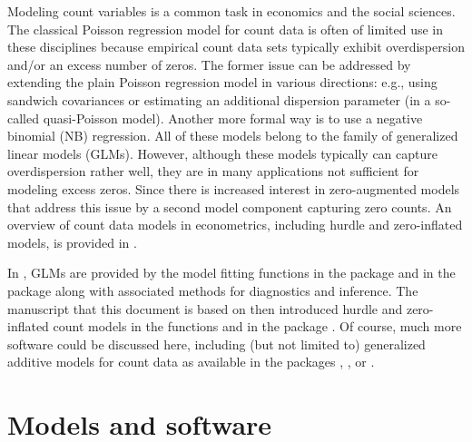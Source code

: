 \documentclass[article]{jss}
\newcommand{\fct}[1]{\code{#1()}}
\begin{document}
Modeling count variables is a common task in economics and the social sciences.
The classical Poisson regression model for count data is often of limited use in
these disciplines because empirical count data sets typically exhibit
overdispersion and/or an excess number of zeros. The former issue can be
addressed by extending  the plain Poisson regression model in various
directions: e.g., using sandwich covariances or estimating an additional
dispersion parameter (in a so-called quasi-Poisson model). Another more formal
way is to use a negative binomial (NB) regression. All of these models belong to
the family of generalized linear models (GLMs). However, although these models
typically can capture overdispersion rather well, they are in many applications
not sufficient for  modeling excess zeros. Since \cite{Mullahy:1986} there is
increased interest in zero-augmented models that address this issue by a second
model component capturing zero counts. An overview of count data models in
econometrics, including  hurdle and zero-inflated models, is provided in
\cite{Cameron+Trivedi:2013}.

In  \citep{R}, GLMs are provided by the model fitting functions
\fct{glm} in the  package and \fct{glm.nb} in the  package
\citep[][Chapter~7.4]{Venables+Ripley:2002} along with associated methods for
diagnostics and inference. The manuscript that this document is based on
\citep{Zeileis+Kleiber+Jackman:2008} then introduced hurdle and zero-inflated
count models in the functions \fct{hurdle} and \fct{zeroinfl} in the 
package \citep{Jackman:2015}. Of course, much more software could be discussed
here, including (but not limited to) generalized additive models for count data
as available in the  packages  \cite{Wood:2006},
 \citep{Stasinopoulos+Rigby:2007}, or  \citep{Yee:2009}.



\section{Models and software} \label{sec:models}
\end{document}
